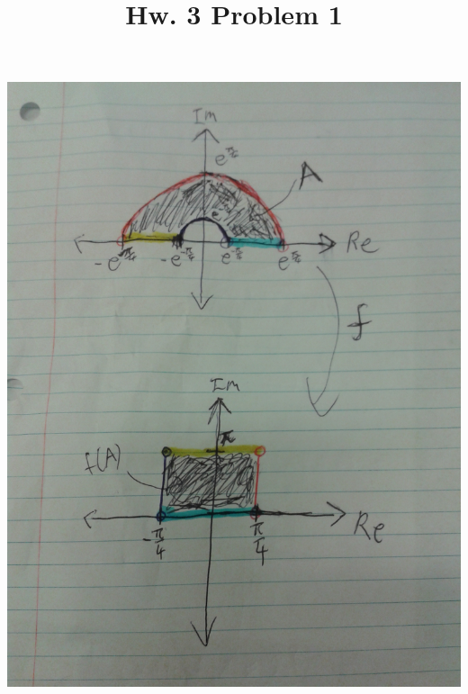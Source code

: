 \documentclass[12pt]{article}
\begin{document}
\title{Hw. 3 Problem 1}
\maketitle

\begin{center}
\includegraphics[scale=0.2]{q1.jpg}
\end{center}
\end{document}
